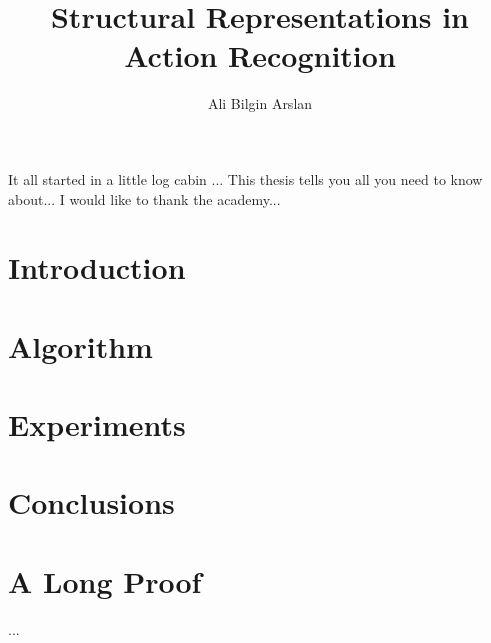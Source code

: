 \documentclass{brownthesis}
\begin{document}
\title{Structural Representations in Action Recognition}
\author{Ali Bilgin Arslan}
     \abstractpage
     \beforepreface
     It all started in a little log cabin ...
     This thesis tells you all you need to know about...
     I would like to thank the academy...
     \afterpreface

    \chapter{Introduction}
       

    \chapter{Algorithm}
       

    \chapter{Experiments}
       
          

     \chapter{Conclusions}


     \appendix
     \chapter{A Long Proof}
     ...
     
     
     
\end{document}
